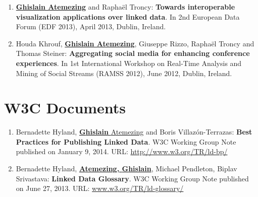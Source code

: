 \begin{enumerate}
 \item \underline{\textbf{Ghislain Atemezing}} and Rapha{\"e}l Troncy: \textbf{Towards interoperable visualization applications over linked data}. In 2nd European Data Forum (EDF 2013), April 2013, Dublin, Ireland.

 \item Houda Khrouf, \underline{\textbf{Ghislain Atemezing}}, Giuseppe Rizzo, Rapha\"{e}l Troncy and Thomas Steiner: \textbf{Aggregating social media for enhancing conference experiences}. In 1st International Workshop on Real-Time Analysis and Mining of Social Streams (RAMSS 2012), June 2012, Dublin, Ireland.
\end{enumerate}

\section*{W3C Documents}
\label{sec:w3cdocs}
\begin{enumerate}
 \item {B}ernadette {H}yland, \underline{\textbf{{G}hislain} {A}temezing} and {B}oris {V}illaz{\'o}n-{T}errazas: \textbf{Best Practices for Publishing Linked Data}. W3C Working Group Note published on January 9, 2014. URL: \url{http://www.w3.org/TR/ld-bp/}

 \item {B}ernadette {H}yland, \underline{\textbf{{A}temezing, {G}hislain}}, {M}ichael {P}endleton, {B}iplav {S}rivastava: \textbf{Linked Data Glossary}. W3C Working Group Note published on June 27, 2013. URL: \url{www.w3.org/TR/ld-glossary/}
\end{enumerate}